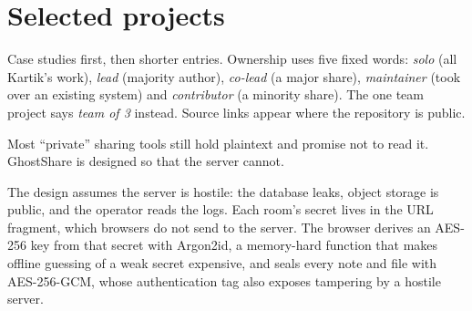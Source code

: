 \section{Selected projects}\label{sec:projects}

Case studies first, then shorter entries. Ownership uses five fixed words: \emph{solo} (all
Kartik's work), \emph{lead} (majority author), \emph{co-lead} (a major share), \emph{maintainer}
(took over an existing system) and \emph{contributor} (a minority share). The one team project
says \emph{team of 3} instead. Source links appear where the repository is public.


\begin{facts}
\end{facts}

 Most ``private'' sharing tools still hold plaintext and promise not to read it.
GhostShare is designed so that the server cannot.

 The design assumes the server is hostile: the database leaks, object storage
is public, and the operator reads the logs. Each room's secret lives in the URL fragment, which
browsers do not send to the server. The browser derives an AES-256 key from that secret with
Argon2id, a memory-hard function that makes offline guessing of a weak secret expensive, and seals
every note and file with AES-256-GCM, whose authentication tag also exposes tampering by a hostile
server.

